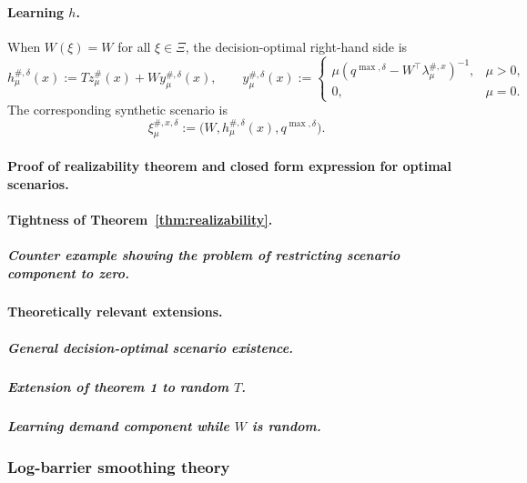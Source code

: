 \paragraph{Learning $h$.}
When $W(\xi)=W$ for all $\xi\in\Xi$, the decision-optimal right-hand side is
\begin{equation}
\label{eq:h-construct}
h_\mu^{\#,\delta}(x):=
Tz_\mu^\#(x)+W y_\mu^{\#,\delta}(x),
\qquad
y_\mu^{\#,\delta}(x):=
\begin{cases}
\mu\left(q^{\max,\delta}-W^\top\lambda_\mu^{\#,x}\right)^{-1}, & \mu>0,\\
0, & \mu=0.
\end{cases}
\end{equation}
The corresponding synthetic scenario is
\begin{equation}
\label{eq:h-scenario-appendix}
\xi_\mu^{\#,x,\delta}
:=
\bigl(W,h_\mu^{\#,\delta}(x),q^{\max,\delta}\bigr).
\end{equation}

\paragraph{Proof of realizability theorem and closed form expression for optimal scenarios.}

\paragraph{Tightness of Theorem~\ref{thm:realizability}.}

\subparagraph{Counter example showing the problem of restricting scenario component to zero.}
\label{app:restricted-scenario-counterexample}

\paragraph{Theoretically relevant extensions.}
\label{app:random-WT-extension}

\subparagraph{General decision-optimal scenario existence.}
\label{app:general-decision-optimal-scenario-existence}

\subparagraph{Extension of theorem 1 to random $T$.}
\label{app:random-T-extension}

\subparagraph{Learning demand component while $W$ is random.}
\label{app:learning-h-random-W}

\subsubsection{Log-barrier smoothing theory}
\label{app:logbarrier-theory}


